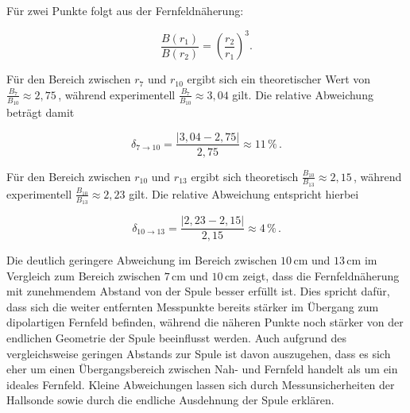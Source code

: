 \noindent Für zwei Punkte folgt aus der Fernfeldnäherung:

\begin{equation}
\frac{B(r_1)}{B(r_2)}=\left(\frac{r_2}{r_1}\right)^3.
\end{equation}

\noindent Für den Bereich zwischen $r_7$ und $r_{10}$ ergibt sich ein theoretischer Wert von $\frac{B_7}{B_{10}}\approx 2{,}75$\,, während experimentell
$\frac{B_7}{B_{10}}\approx 3{,}04$ gilt. Die relative Abweichung beträgt damit

\begin{equation}
\delta_{7\to10}=
\frac{|3{,}04-2{,}75|}{2{,}75}
\approx 11\,\%\,.
\end{equation}

\noindent Für den Bereich zwischen $r_{10}$ und $r_{13}$ ergibt sich theoretisch
$\frac{B_{10}}{B_{13}}\approx 2{,}15$\,, während experimentell
$\frac{B_{10}}{B_{13}}\approx 2{,}23$ gilt. Die relative Abweichung entspricht hierbei

\begin{equation}
\delta_{10\to13}=
\frac{|2{,}23-2{,}15|}{2{,}15}
\approx 4\,\%\,.
\end{equation}

\noindent Die deutlich geringere Abweichung im Bereich zwischen $10\,\mathrm{cm}$ und $13\,\mathrm{cm}$ im Vergleich zum Bereich zwischen $7\,\mathrm{cm}$ und $10\,\mathrm{cm}$ zeigt, dass die Fernfeldnäherung mit zunehmendem Abstand von der Spule besser erfüllt ist. Dies spricht dafür, dass sich die weiter entfernten Messpunkte bereits stärker im Übergang zum dipolartigen Fernfeld befinden, während die näheren Punkte noch stärker von der endlichen Geometrie der Spule beeinflusst werden.  Auch aufgrund des vergleichsweise geringen Abstands zur Spule ist davon auszugehen, dass es sich eher um einen Übergangsbereich zwischen Nah- und Fernfeld handelt als um ein ideales Fernfeld. Kleine Abweichungen lassen sich durch Messunsicherheiten der Hallsonde sowie durch die endliche Ausdehnung der Spule erklären.~\cite[S. 897 ff.]{Tipler}
